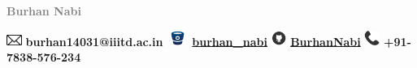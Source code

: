 \documentclass{article}
\author{}
\title{}
\begin{document}
	\begin{center}
		\fontsize{20}{50}\textbf{ \textcolor{Gray}{Burhan Nabi}}\\
	\end{center} 

	\includegraphics[width=0.5cm  ]{buttons/mail.png}
	\hspace{2pt}
	\fontsize{10}{12}\textcolor{ProcessBlue}{ \textbf{burhan14031@iiitd.ac.in} }
	\hspace{25pt}
	\includegraphics[width=0.7cm  ]{buttons/bitbucket.png}
	\hspace{2pt}
	\fontsize{10}{12}\textcolor{ProcessBlue}{
	\href{https://bitbucket.org/burhan_nabi/}{\textbf{burhan\_nabi}}
	 }
	\hspace{25pt}
	\includegraphics[width=0.5cm  ]{buttons/github.png}
	\hspace{2pt}
	\fontsize{10}{12}\textcolor{ProcessBlue}{ 
	\href{https://github.com/BurhanNabi}{\textbf{BurhanNabi}}
	}
	\hspace{25pt}
	\includegraphics[width=0.5cm  ]{buttons/phone.png}
	\hspace{2pt}
	\fontsize{10}{12}\textcolor{ProcessBlue}{ \textbf{+91-7838-576-234} }\\
	
	
\end{document}
